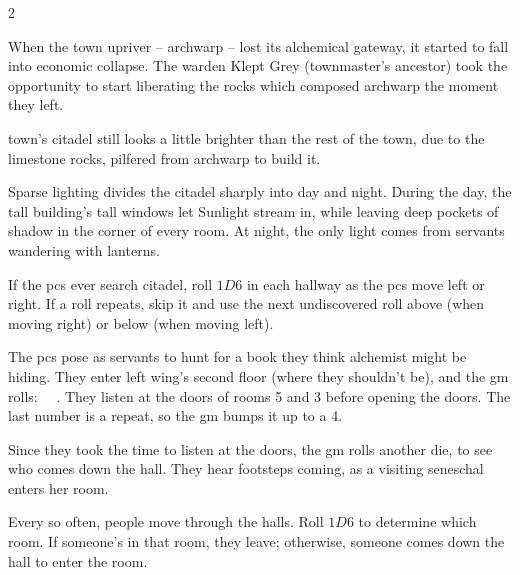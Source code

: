 \begin{multicols}{2}
\begin{exampletext}
  When the town upriver -- \gls{archwarp} -- lost its alchemical gateway, it started to fall into economic collapse.
  The \Gls{warden} Klept Grey (\gls{townmaster}'s ancestor) took the opportunity to start liberating the rocks which composed \gls{archwarp} the moment they left.

  \Gls{town}'s citadel still looks a little brighter than the rest of the town, due to the limestone rocks, pilfered from \gls{archwarp} to build it.
\end{exampletext}

Sparse lighting divides the citadel sharply into day and night.
During the day, the tall building's tall windows let Sunlight stream in, while leaving deep pockets of shadow in the corner of every room.
At night, the only light comes from servants wandering with lanterns.

If the \glspl{pc} ever search \gls{citadel}, roll $1D6$ in each hallway as the \glspl{pc} move left or right.
If a roll repeats, skip it and use the next undiscovered roll above (when moving right) or below (when moving left).

\begin{exampletext}
  The \glspl{pc} pose as servants to hunt for a book they think \gls{alchemist} might be hiding.
  They enter left wing's second floor (where they shouldn't be), and the \gls{gm} rolls: ~~.
  They listen at the doors of rooms 5 and 3 before opening the doors.
  The last number is a repeat, so the \gls{gm} bumps it up to a 4.

  Since they took the time to listen at the doors, the \gls{gm} rolls another die, to see who comes down the hall.
  They hear footsteps coming, as a visiting \gls{seneschal} enters her room.
\end{exampletext}

Every so often, people move through the halls.
Roll $1D6$ to determine which room.
If someone's in that room, they leave; otherwise, someone comes down the hall to enter the room.


\end{multicols}

